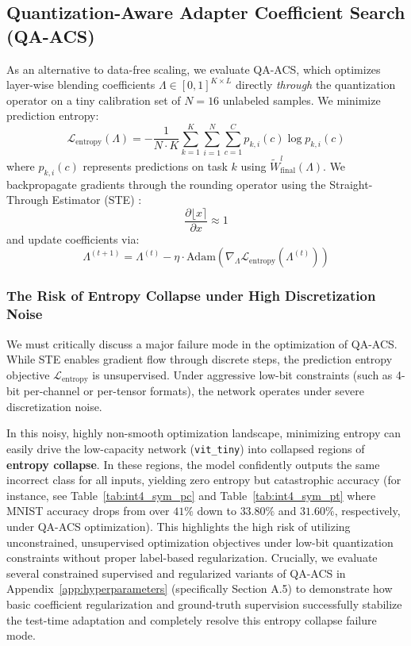 \subsection{Quantization-Aware Adapter Coefficient Search (QA-ACS)}
As an alternative to data-free scaling, we evaluate QA-ACS, which optimizes layer-wise blending coefficients $\Lambda \in [0, 1]^{K \times L}$ directly \emph{through} the quantization operator on a tiny calibration set of $N=16$ unlabeled samples. We minimize prediction entropy:
\begin{equation}
  \mathcal{L}_{\text{entropy}}(\Lambda) = -\frac{1}{N \cdot K} \sum_{k=1}^K \sum_{i=1}^N \sum_{c=1}^C p_{k, i}(c) \log p_{k, i}(c)
\end{equation}
where $p_{k, i}(c)$ represents predictions on task $k$ using $\tilde{W}^l_{\text{final}}(\Lambda)$. We backpropagate gradients through the rounding operator using the Straight-Through Estimator (STE) \cite{Jacob2018Quantization}:
\begin{equation}
  \frac{\partial \lfloor x \rceil}{\partial x} \approx 1
\end{equation}
and update coefficients via:
\begin{equation}
  \Lambda^{(t+1)} = \Lambda^{(t)} - \eta \cdot \text{Adam}\left(\nabla_{\Lambda} \mathcal{L}_{\text{entropy}}(\Lambda^{(t)})\right)
\end{equation}

\subsubsection{The Risk of Entropy Collapse under High Discretization Noise}
We must critically discuss a major failure mode in the optimization of QA-ACS. While STE enables gradient flow through discrete steps, the prediction entropy objective $\mathcal{L}_{\text{entropy}}$ is unsupervised. Under aggressive low-bit constraints (such as 4-bit per-channel or per-tensor formats), the network operates under severe discretization noise. 

In this noisy, highly non-smooth optimization landscape, minimizing entropy can easily drive the low-capacity network (\texttt{vit\_tiny}) into collapsed regions of \textbf{entropy collapse}. In these regions, the model confidently outputs the same incorrect class for all inputs, yielding zero entropy but catastrophic accuracy (for instance, see Table~\ref{tab:int4_sym_pc} and Table~\ref{tab:int4_sym_pt} where MNIST accuracy drops from over $41\%$ down to $33.80\%$ and $31.60\%$, respectively, under QA-ACS optimization). This highlights the high risk of utilizing unconstrained, unsupervised optimization objectives under low-bit quantization constraints without proper label-based regularization. Crucially, we evaluate several constrained supervised and regularized variants of QA-ACS in Appendix~\ref{app:hyperparameters} (specifically Section A.5) to demonstrate how basic coefficient regularization and ground-truth supervision successfully stabilize the test-time adaptation and completely resolve this entropy collapse failure mode.


